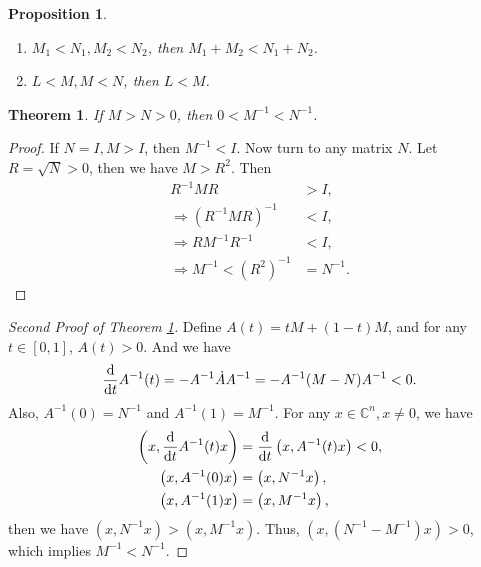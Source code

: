\documentclass[11pt]{book}
\newtheorem{theorem}{Theorem}[chapter]
\newtheorem{proposition}{Proposition}[chapter]
\theoremstyle{definition}
\numberwithin{equation}{chapter}
\begin{document}
\medskip

\begin{proposition}
~\begin{enumerate}[label=(\alph*)]
    \item $M_1 < N_1, M_2 < N_2$, then $M_1 + M_2 < N_1 + N_2$.
    \item $L < M, M < N$, then $L < M$.
\end{enumerate}
\end{proposition}

\medskip

\begin{theorem}\label{inverse_of_positive_matrix}
If $M > N > 0$, then $0 < M^{-1} < N^{-1}$.
\end{theorem}
\begin{proof}
If $N = I, M > I$, then $M^{-1} < I$. Now turn to any matrix $N$. Let $R = \sqrt{N} > 0$, then we have $M > R^2$. Then
\begin{align*}
    R^{-1} M R & > I, \\
    \Rightarrow \left(R^{-1} M R\right)^{-1} & < I, \\
    \Rightarrow R M^{-1} R^{-1} & < I, \\
    \Rightarrow M^{-1} < \left(R^2\right)^{-1} & = N^{-1}.
\end{align*}
\end{proof}

\begin{proof}[Second Proof of Theorem \ref{inverse_of_positive_matrix}]
Define $A(t) = tM + (1-t)M$, and for any $t\in [0,1]$, $A(t) > 0$. And we have 
\begin{align*}
    \dv{}{t}A^{-1}(t) = - A^{-1} \dot{A} A^{-1} = - A^{-1} (M - N) A^{-1} < 0.
\end{align*}
Also, $A^{-1}(0) = N^{-1}$  and $A^{-1}(1) = M^{-1}$. For any $x\in \mathbb{C}^n, x\neq 0$, we have 
\begin{align*}
    \left(x, \dv{}{t}A^{-1}(t)x \right) & = \dv{}{t} \left(x, A^{-1}(t)x \right) < 0, \\
    \left(x, A^{-1}(0)x \right) & = \left(x, N^{-1}x \right), \\
    \left(x, A^{-1}(1)x \right) & = \left(x, M^{-1}x \right),
\end{align*}
then we have $\left(x, N^{-1}x \right) > \left(x, M^{-1}x \right)$. Thus, $\left(x, (N^{-1} - M^{-1})x \right) > 0$, which implies $M^{-1} < N^{-1}$.
\end{proof}

\medskip
\end{document}
